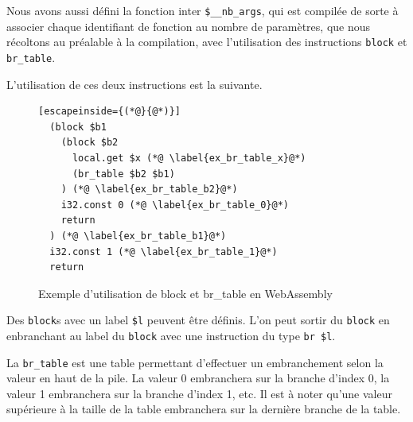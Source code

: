 \documentclass{rapportECL}
\begin{document}




\medskip
Nous avons aussi défini la fonction inter \verb|$__nb_args|, qui est compilée de sorte à associer chaque identifiant de fonction au nombre de paramètres, que nous récoltons au préalable à la compilation, avec l'utilisation des instructions \verb|block| et \verb|br_table|.

L'utilisation de ces deux instructions est la suivante.

\begin{figure}[H]
	\begin{lstlisting}[escapeinside={(*@}{@*)}]
  (block $b1
    (block $b2
      local.get $x (*@ \label{ex_br_table_x}@*)
      (br_table $b2 $b1)
    ) (*@ \label{ex_br_table_b2}@*)
    i32.const 0 (*@ \label{ex_br_table_0}@*)
    return
  ) (*@ \label{ex_br_table_b1}@*)
  i32.const 1 (*@ \label{ex_br_table_1}@*)
  return
	\end{lstlisting}
	\caption{Exemple d'utilisation de block et br\_table en WebAssembly}
	\label{listing:example_block_br_table}
\end{figure}

Des \verb|block|s avec un label \verb|$l| peuvent être définis. L'on peut sortir du \verb|block| en enbranchant au label du \verb|block| avec une instruction du type \verb|br $l|.

La \verb|br_table| est une table permettant d'effectuer un embranchement selon la valeur en haut de la pile.
La valeur 0 embranchera sur la branche d'index 0, la valeur 1 embranchera sur la branche d'index 1, etc.
Il est à noter qu'une valeur supérieure à la taille de la table embranchera sur la dernière branche de la table.
\end{document}

